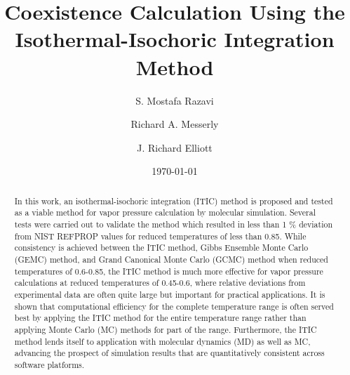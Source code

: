 \documentclass[%
 aip,
 jcp,
 sd,%
 amsmath,amssymb,
 reprint,%
]{revtex4-1}
\begin{document}

\title{Coexistence Calculation Using the Isothermal-Isochoric Integration Method}

\author{S. Mostafa Razavi}

\author{Richard A. Messerly}

\author{J. Richard Elliott}

\date{\today}


\begin{abstract}
In this work, an isothermal-isochoric integration (ITIC) method is proposed and tested as a viable method for vapor pressure calculation by molecular simulation. Several tests were carried out to validate the method which resulted in less than 1 \% deviation from NIST REFPROP values for reduced temperatures of less than 0.85. While consistency is achieved between the ITIC method, Gibbs Ensemble Monte Carlo (GEMC) method, and Grand Canonical Monte Carlo (GCMC) method when reduced temperatures of 0.6-0.85, the ITIC method is much more effective for vapor pressure calculations at reduced temperatures of 0.45-0.6, where relative deviations from experimental data are often quite large but important for practical applications. It is shown that computational efficiency for the complete temperature range is often served best by applying the ITIC method for the entire temperature range rather than applying Monte Carlo (MC) methods for part of the range. Furthermore, the ITIC method lends itself to application with molecular dynamics (MD) as well as MC, advancing the prospect of simulation results that are quantitatively consistent across software platforms.
\end{abstract}


\maketitle
\end{document}
